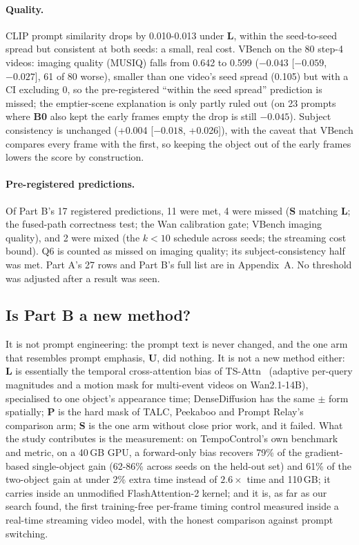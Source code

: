 \documentclass[10pt,a4paper]{article}
\newcommand{\arm}[1]{\textbf{#1}}
\begin{document}
\paragraph{Quality.} CLIP prompt similarity drops by 0.010-0.013 under \arm{L}, within the seed-to-seed spread but consistent at both seeds: a small, real cost. VBench on the 80 step-4 videos: imaging quality (MUSIQ) falls from 0.642 to 0.599 ($-0.043$ [$-0.059$, $-0.027$], 61 of 80 worse), smaller than one video's seed spread (0.105) but with a CI excluding 0, so the pre-registered ``within the seed spread'' prediction is missed; the emptier-scene explanation is only partly ruled out (on 23 prompts where \arm{B0} also kept the early frames empty the drop is still $-0.045$). Subject consistency is unchanged (+0.004 [$-0.018$, +0.026]), with the caveat that VBench compares every frame with the first, so keeping the object out of the early frames lowers the score by construction.

\paragraph{Pre-registered predictions.} Of Part B's 17 registered predictions, 11 were met, 4 were missed (\arm{S} matching \arm{L}; the fused-path correctness test; the Wan calibration gate; VBench imaging quality), and 2 were mixed (the $k{<}10$ schedule across seeds; the streaming cost bound). Q6 is counted as missed on imaging quality; its subject-consistency half was met. Part A's 27 rows and Part B's full list are in Appendix~A. No threshold was adjusted after a result was seen.

\subsection{Is Part B a new method?}
It is not prompt engineering: the prompt text is never changed, and the one arm that resembles prompt emphasis, \arm{U}, did nothing. It is not a new method either: \arm{L} is essentially the temporal cross-attention bias of TS-Attn~\cite{tsattn} (adaptive per-query magnitudes and a motion mask for multi-event videos on Wan2.1-14B), specialised to one object's appearance time; DenseDiffusion has the same $\pm$ form spatially; \arm{P} is the hard mask of TALC, Peekaboo and Prompt Relay's comparison arm; \arm{S} is the one arm without close prior work, and it failed. What the study contributes is the measurement: on TempoControl's own benchmark and metric, on a 40\,GB GPU, a forward-only bias recovers 79\% of the gradient-based single-object gain (62-86\% across seeds on the held-out set) and 61\% of the two-object gain at under 2\% extra time instead of $2.6\times$ time and 110\,GB; it carries inside an unmodified FlashAttention-2 kernel; and it is, as far as our search found, the first training-free per-frame timing control measured inside a real-time streaming video model, with the honest comparison against prompt switching.
\end{document}
